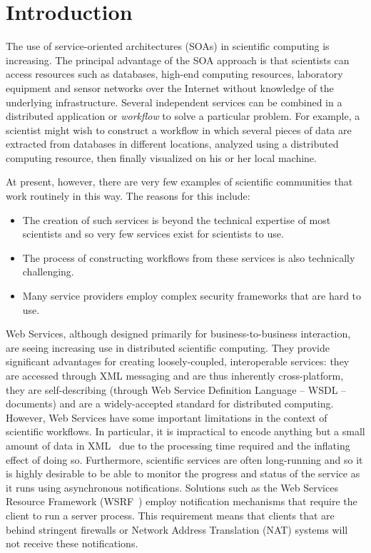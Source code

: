\documentclass[a4paper]{article}
\begin{document}
\section{Introduction}\label{sec:intro}
The use of service-oriented architectures (SOAs) in scientific computing is increasing.  The principal advantage of the SOA approach is that scientists can access resources such as databases, high-end computing resources, laboratory equipment and sensor networks over the Internet without knowledge of the underlying infrastructure.  Several independent services can be combined in a distributed application or \textit{workflow\/} to solve a particular problem.  For example, a scientist might wish to construct a workflow in which several pieces of data are extracted from databases in different locations, analyzed using a distributed computing resource, then finally visualized on his or her local machine.

At present, however, there are very few examples of scientific communities that work routinely in this way.  The reasons for this include:

\begin{itemize}
\item The creation of such services is beyond the technical expertise of most scientists and so very few services exist for scientists to use.
\item The process of constructing workflows from these services is also technically challenging.
\item Many service providers employ complex security frameworks that are hard to use.
\end{itemize}

Web Services, although designed primarily for business-to-business interaction, are seeing increasing use in distributed scientific computing.  They provide significant advantages for creating loosely-coupled, interoperable services: they are accessed through XML messaging and are thus inherently cross-platform, they are self-describing (through Web Service Definition Language -- WSDL -- documents) and are a widely-accepted standard for distributed computing.  However, Web Services have some important limitations in the context of scientific workflows. In particular, it is impractical to encode anything but a small amount of data in XML~\cite{bustamente:2000, chiu:2002, davis:2002} due to the processing time required and the inflating effect of doing so.  Furthermore, scientific services are often long-running and so it is highly desirable to be able to monitor the progress and status of the service as it runs using asynchronous notifications.  Solutions such as the Web Services Resource Framework (WSRF~\cite{WSRF}) employ notification mechanisms that require the client to run a server process.  This requirement means that clients that are behind stringent firewalls or Network Address Translation (NAT) systems will not receive these notifications.
\end{document}
